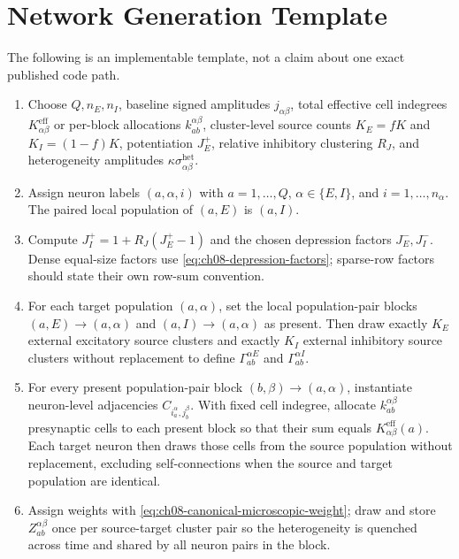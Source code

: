 \section{Network Generation Template}
\label{sec:ch08-network-generation-template}

The following is an implementable template, not a claim about one exact
published code path.
\begin{enumerate}
    \item Choose \(Q,n_E,n_I\), baseline signed amplitudes
    \(j_{\alpha\beta}\), total effective cell indegrees
    \(K_{\alpha\beta}^{\mathrm{eff}}\) or per-block allocations
    \(k_{ab}^{\alpha\beta}\), cluster-level source counts \(K_E=fK\) and
    \(K_I=(1-f)K\), potentiation \(J_E^+\), relative inhibitory clustering
    \(R_J\), and heterogeneity amplitudes
    \(\kappa\sigma_{\alpha\beta}^{\mathrm{het}}\).
    \item Assign neuron labels \((a,\alpha,i)\) with
    \(a=1,\ldots,Q\), \(\alpha\in\{E,I\}\), and
    \(i=1,\ldots,n_\alpha\). The paired local population of \((a,E)\) is
    \((a,I)\).
    \item Compute \(J_I^+=1+R_J(J_E^+-1)\) and the chosen depression factors
    \(J_E^-,J_I^-\). Dense equal-size factors use
    \cref{eq:ch08-depression-factors}; sparse-row factors should state their
    own row-sum convention.
    \item For each target population \((a,\alpha)\), set the local
    population-pair blocks \((a,E)\to(a,\alpha)\) and
    \((a,I)\to(a,\alpha)\) as present. Then draw exactly \(K_E\) external
    excitatory source clusters and exactly \(K_I\) external inhibitory source
    clusters without replacement to define
    \(\Gamma_{ab}^{\alpha E}\) and \(\Gamma_{ab}^{\alpha I}\).
    \item For every present population-pair block
    \((b,\beta)\to(a,\alpha)\), instantiate neuron-level adjacencies
    \(C_{i_a^\alpha,j_b^\beta}\). With fixed cell indegree, allocate
    \(k_{ab}^{\alpha\beta}\) presynaptic cells to each present block so that
    their sum equals \(K_{\alpha\beta}^{\mathrm{eff}}(a)\). Each target neuron
    then draws those cells from the source population without replacement,
    excluding self-connections when the source and target population are
    identical.
    \item Assign weights with
    \cref{eq:ch08-canonical-microscopic-weight}; draw and store
    \(Z_{ab}^{\alpha\beta}\) once per source-target cluster pair so the
    heterogeneity is quenched across time and shared by all neuron pairs in the
    block.
\end{enumerate}

